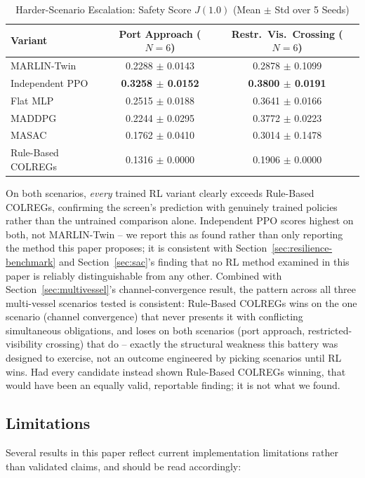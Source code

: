 \documentclass[journal,twocolumn,10pt]{IEEEtran}
\begin{document}
\begin{table}[h]
\caption{Harder-Scenario Escalation: Safety Score $J(1.0)$ (Mean $\pm$ Std over 5 Seeds)}
\label{tab:battery_table}
\centering
\begin{tabular}{lcc}
\toprule
\textbf{Variant} & \textbf{Port Approach ($N{=}6$)} & \textbf{Restr.\ Vis.\ Crossing ($N{=}6$)} \\
\midrule
MARLIN-Twin & 0.2288 $\pm$ 0.0143 & 0.2878 $\pm$ 0.1099 \\
Independent PPO & \textbf{0.3258 $\pm$ 0.0152} & \textbf{0.3800 $\pm$ 0.0191} \\
Flat MLP & 0.2515 $\pm$ 0.0188 & 0.3641 $\pm$ 0.0166 \\
MADDPG & 0.2244 $\pm$ 0.0295 & 0.3772 $\pm$ 0.0223 \\
MASAC & 0.1762 $\pm$ 0.0410 & 0.3014 $\pm$ 0.1478 \\
\midrule
Rule-Based COLREGs & 0.1316 $\pm$ 0.0000 & 0.1906 $\pm$ 0.0000 \\
\bottomrule
\end{tabular}
\end{table}

On both scenarios, \emph{every} trained RL variant clearly exceeds Rule-Based COLREGs, confirming the screen's prediction with genuinely trained policies rather than the untrained comparison alone. Independent PPO scores highest on both, not MARLIN-Twin -- we report this as found rather than only reporting the method this paper proposes; it is consistent with Section~\ref{sec:resilience-benchmark} and Section~\ref{sec:sac}'s finding that no RL method examined in this paper is reliably distinguishable from any other. Combined with Section~\ref{sec:multivessel}'s channel-convergence result, the pattern across all three multi-vessel scenarios tested is consistent: Rule-Based COLREGs wins on the one scenario (channel convergence) that never presents it with conflicting simultaneous obligations, and loses on both scenarios (port approach, restricted-visibility crossing) that do -- exactly the structural weakness this battery was designed to exercise, not an outcome engineered by picking scenarios until RL wins. Had every candidate instead shown Rule-Based COLREGs winning, that would have been an equally valid, reportable finding; it is not what we found.

\subsection{Limitations}
\label{sec:limitations}
Several results in this paper reflect current implementation limitations rather than validated claims, and should be read accordingly:
\end{document}

